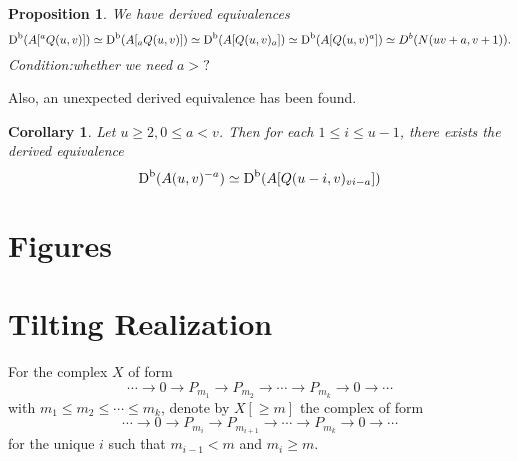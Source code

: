 \documentclass[a4paper, reqno]{amsart}
\newtheorem{cor}[thm]{Corollary}
\newtheorem{prop}[thm]{Proposition}
\theoremstyle{definition}
\theoremstyle{remark}
\numberwithin{equation}{section}
\begin{document}
\begin{figure}[H]
    \centering
    \small{  }\label{Q(m,n)}
\end{figure}

\begin{prop} 
   We have derived equivalences
   $$   \textup{D}^{\textup{b}}(A[^{a}Q(u,v)]) \simeq \textup{D}^{\textup{b}}(A[_{a}Q(u,v)])\simeq  \textup{D}^{\textup{b}}(A[Q(u,v)_{a}]) \simeq \textup{D}^{\textup{b}}(A[Q(u,v)^{a}])\simeq  D^{b}(N(uv+a,v+1)).$$ 
   {\color{red}Condition:whether we need $a>?$}
\end{prop}

Also, an unexpected derived equivalence has been found.

\begin{cor}
Let $u\geq2, 0\leq a < v$. Then for each $1\leq i\leq u-1$, there exists the derived equivalence
   $$  \textup{D}^{\textup{b}}(A(u,v)^{-a}) \simeq   \textup{D}^{\textup{b}}(A[Q(u-i,v)_{vi-a}])$$
\end{cor} 

\newpage

\appendix
\section{Figures}


\section{Tilting Realization}
For the complex $X$ of form $$\cdots\rightarrow 0\rightarrow P_{m_1}\rightarrow P_{m_2}\rightarrow \cdots\rightarrow P_{m_k}\rightarrow 0\rightarrow\cdots$$
with $m_1\leq m_2\leq\cdots\leq m_k$, denote by $X[\geq m]$ the complex of form
$$\cdots\rightarrow 0\rightarrow P_{m_i}\rightarrow P_{m_{i+1}}\rightarrow \cdots\rightarrow P_{m_k}\rightarrow0\rightarrow \cdots$$
for the unique $i$ such that $m_{i-1}< m$ and $m_i\geq m$.
\end{document}
